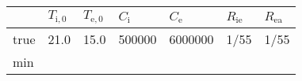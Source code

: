 \documentclass[
]{article}
\begin{document}
\begin{longtable}[]{@{}lllllll@{}}
\toprule
\begin{minipage}[b]{0.10\columnwidth}\raggedright
\strut
\end{minipage} & \begin{minipage}[b]{0.10\columnwidth}\raggedright
\(T_{\text{i},0}\)\strut
\end{minipage} & \begin{minipage}[b]{0.10\columnwidth}\raggedright
\(T_{\text{e},0}\)\strut
\end{minipage} & \begin{minipage}[b]{0.15\columnwidth}\raggedright
\(C_{\text{i}}\)\strut
\end{minipage} & \begin{minipage}[b]{0.17\columnwidth}\raggedright
\(C_{\text{e}}\)\strut
\end{minipage} & \begin{minipage}[b]{0.10\columnwidth}\raggedright
\(R_{\text{ie}}\)\strut
\end{minipage} & \begin{minipage}[b]{0.10\columnwidth}\raggedright
\(R_{\text{ea}}\)\strut
\end{minipage}\tabularnewline
\midrule
\endhead
\begin{minipage}[t]{0.10\columnwidth}\raggedright
true\strut
\end{minipage} & \begin{minipage}[t]{0.10\columnwidth}\raggedright
21.0\strut
\end{minipage} & \begin{minipage}[t]{0.10\columnwidth}\raggedright
15.0\strut
\end{minipage} & \begin{minipage}[t]{0.15\columnwidth}\raggedright
500000\strut
\end{minipage} & \begin{minipage}[t]{0.17\columnwidth}\raggedright
6000000\strut
\end{minipage} & \begin{minipage}[t]{0.10\columnwidth}\raggedright
1/55\strut
\end{minipage} & \begin{minipage}[t]{0.10\columnwidth}\raggedright
1/55\strut
\end{minipage}\tabularnewline
\begin{minipage}[t]{0.10\columnwidth}\raggedright
min\strut
\end{minipage} & \begin{minipage}[t]{0.10\columnwidth}\raggedright

\end{minipage}
\end{longtable}
\end{document}
